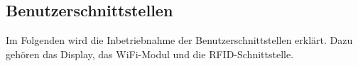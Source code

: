 \newpage
\subsection{Benutzerschnittstellen}
\label{sec:Inbetriebnahme_Benutzerschnittstellen}

Im Folgenden wird die Inbetriebnahme der Benutzerschnittstellen erklärt. Dazu gehören das Display, das WiFi-Modul und die RFID-Schnittstelle.